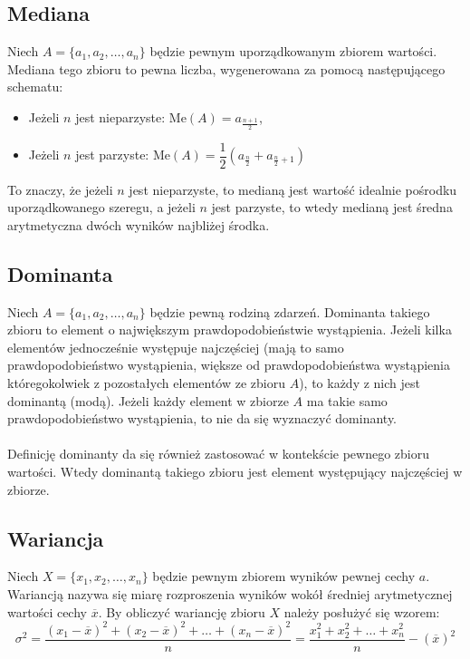 \documentclass[14pt,a4paper]{extarticle}
\begin{document}
\newpage

\subsection{Mediana}
\noindent Niech $A = \{a_{1}, a_{2}, \ldots, a_{n}\}$ będzie pewnym uporządkowanym zbiorem wartości.
Mediana tego zbioru to pewna liczba, wygenerowana za pomocą następującego schematu:
\begin{itemize}
   \item Jeżeli $n$ jest nieparzyste: $\text{Me}(A) = a_{\frac{n+1}{2}}$,
   \item Jeżeli $n$ jest parzyste: $\text{Me}(A) = \dfrac{1}{2}\left(a_{\frac{n}{2}} + a_{\frac{n}{2}+1}\right)$
\end{itemize}
To znaczy, że jeżeli $n$ jest nieparzyste, to medianą jest wartość idealnie pośrodku uporządkowanego
szeregu, a jeżeli $n$ jest parzyste, to wtedy medianą jest średna arytmetyczna dwóch wyników najbliżej środka.

\subsection{Dominanta}
Niech $A = \{a_{1}, a_{2}, \ldots, a_{n}\}$ będzie pewną rodziną zdarzeń. Dominanta takiego zbioru
to element o największym prawdopodobieństwie wystąpienia. Jeżeli kilka elementów jednocześnie występuje
najczęściej (mają to samo prawdopodobieństwo wystąpienia, większe od prawdopodobieństwa wystąpienia któregokolwiek z
pozostałych elementów ze zbioru $A$), to każdy z nich jest dominantą (modą). Jeżeli każdy element w zbiorze $A$ ma
takie samo prawdopodobieństwo wystąpienia, to nie da się wyznaczyć dominanty.\\\\
Definicję dominanty da się również zastosować w kontekście pewnego zbioru wartości. Wtedy dominantą
takiego zbioru jest element występujący najczęściej w zbiorze.

\subsection{Wariancja}
\noindent Niech $X = \{x_{1}, x_{2}, \ldots, x_{n}\}$ będzie pewnym zbiorem wyników pewnej cechy $a$.
Wariancją nazywa się miarę rozproszenia wyników wokół średniej arytmetycznej wartości cechy $\overline{x}$.
By obliczyć wariancję zbioru $X$ należy posłużyć się wzorem:
\[\sigma^{2} = \dfrac{(x_{1} - \overline{x})^{2}+(x_{2} - \overline{x})^{2} + \ldots + (x_{n} - \overline{x})^{2}}{n} = \dfrac{x_{1}^{2} + x_{2}^{2}+\ldots+ x_{n}^{2}}{n}-(\overline{x})^{2}\]
\end{document}
